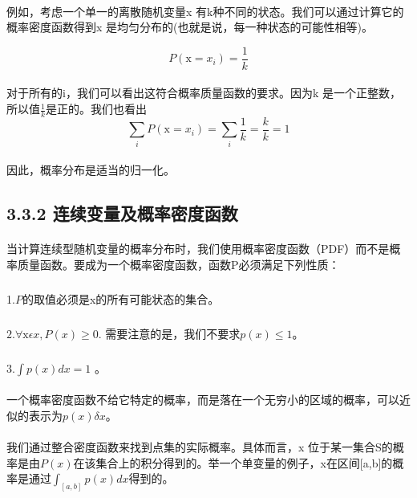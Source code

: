 \documentclass{article}
\begin{document}
    \paragraph{}
    例如，考虑一个单一的离散随机变量x 有k种不同的状态。我们可以通过计算它的概率密度函数得到x 是均匀分布的(也就是说，每一种状态的可能性相等)。

    \begin{equation}
    P(\mathrm{x}=x_i )=\frac{1}{k} \tag{3.1}
    \end{equation}
    \paragraph{}

    对于所有的i，我们可以看出这符合概率质量函数的要求。因为k 是一个正整数，所以值$\frac{1}{k} $是正的。我们也看出
    \begin{equation}
    \sum_i P(\mathrm{x}=x_i )=\sum_i\frac{1}{k}=\frac{k}{k}=1 \tag{3.2}
    \end{equation}
    \paragraph{}
    因此，概率分布是适当的归一化。
    \subsection*{3.3.2 连续变量及概率密度函数}
    \paragraph{}
    当计算连续型随机变量的概率分布时，我们使用概率密度函数（PDF）而不是概率质量函数。要成为一个概率密度函数，函数P必须满足下列性质：
    \subparagraph{}
     1.$P$的取值必须是x的所有可能状态的集合。
    \subparagraph{}
     $2.\forall \mathrm{x} \epsilon x,P(x)\geq0.$ 需要注意的是，我们不要求$p(x) \leq 1$。
    \subparagraph{}
     $3.\int p(x)dx = 1$ 。
    \paragraph{}
    一个概率密度函数不给它特定的概率，而是落在一个无穷小的区域的概率，可以近似的表示为$p(x)\delta x$。
    \paragraph{}
    我们通过整合密度函数来找到点集的实际概率。具体而言，x 位于某一集合S的概率是由$P(x)$在该集合上的积分得到的。举一个单变量的例子，x在区间[a,b]的概率是通过$\int_{[a,b]}p(x)dx$得到的。
\end{document}
